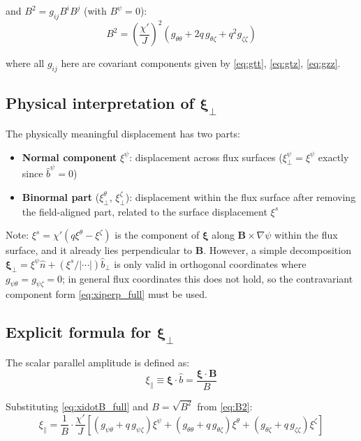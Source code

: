 \documentclass[12pt,a4paper]{article}
\newcommand{\bxi}{\boldsymbol{\xi}}
\begin{document}
and $B^2 = g_{ij}B^iB^j$ (with $B^\psi=0$):
\begin{equation}
    B^2 = \left(\frac{\chi'}{J}\right)^2\!\left(g_{\theta\theta} + 2q\,g_{\theta\zeta} + q^2 g_{\zeta\zeta}\right)
    \label{eq:B2}
\end{equation}

where all $g_{ij}$ here are covariant components given by \eqref{eq:gtt}, \eqref{eq:gtz}, \eqref{eq:gzz}.

\subsection{Physical interpretation of $\bxi_\perp$}

The physically meaningful displacement has two parts:
\begin{itemize}
    \item \textbf{Normal component} $\xi^\psi$: displacement across flux surfaces ($\xi^\psi_\perp = \xi^\psi$ exactly since $\hat{b}^\psi = 0$)
    \item \textbf{Binormal part} ($\xi^\theta_\perp$, $\xi^\zeta_\perp$): displacement within the flux surface after removing the field-aligned part, related to the surface displacement $\xi^s$
\end{itemize}

Note: $\xi^s = \chi'(q\xi^\theta - \xi^\zeta)$ is the component of $\boldsymbol{\xi}$ along $\mathbf{B}\times\nabla\psi$ within the flux surface, and it already lies perpendicular to $\mathbf{B}$. However, a simple decomposition $\bxi_\perp = \xi^\psi\hat{n} + (\xi^s/|\cdots|)\hat{b}_\perp$ is only valid in orthogonal coordinates where $g_{\psi\theta} = g_{\psi\zeta} = 0$; in general flux coordinates this does not hold, so the contravariant component form \eqref{eq:xiperp_full} must be used.

\subsection{Explicit formula for $\bxi_\perp$}

The scalar parallel amplitude is defined as:
\begin{equation}
    \xi_\parallel \equiv \bxi\cdot\hat{b} = \frac{\bxi\cdot\mathbf{B}}{B}
    \label{eq:xipar_def}
\end{equation}

Substituting \eqref{eq:xidotB_full} and $B = \sqrt{B^2}$ from \eqref{eq:B2}:
\begin{equation}
    \xi_\parallel = \frac{1}{B}\cdot\frac{\chi'}{J}\left[
    \left(g_{\psi\theta} + q\,g_{\psi\zeta}\right)\xi^\psi
    + \left(g_{\theta\theta}+q\,g_{\theta\zeta}\right)\xi^\theta
    + \left(g_{\theta\zeta}+q\,g_{\zeta\zeta}\right)\xi^\zeta
    \right]
    \label{eq:xipar}
\end{equation}
\end{document}
